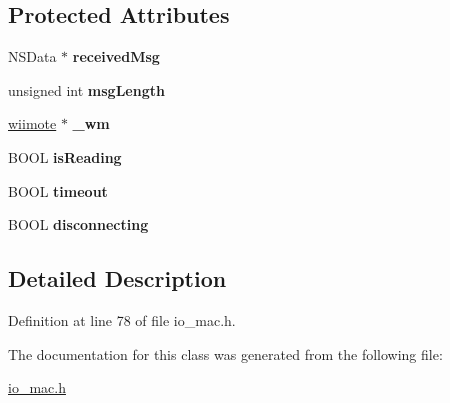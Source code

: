 \subsection*{Protected Attributes}
\begin{DoxyCompactItemize}
\item 
\hypertarget{interface_wii_connect_aec21ec9602201383bba36942cebb6011}{N\-S\-Data $\ast$ {\bfseries received\-Msg}}\label{interface_wii_connect_aec21ec9602201383bba36942cebb6011}

\item 
\hypertarget{interface_wii_connect_ac15cec89972ac285875a76e9f1576060}{unsigned int {\bfseries msg\-Length}}\label{interface_wii_connect_ac15cec89972ac285875a76e9f1576060}

\item 
\hypertarget{interface_wii_connect_aaf493501ef451d77d49546beec8c2db9}{\hyperlink{structwiimote__t}{wiimote} $\ast$ {\bfseries \-\_\-wm}}\label{interface_wii_connect_aaf493501ef451d77d49546beec8c2db9}

\item 
\hypertarget{interface_wii_connect_a578cdc47ce08accc0072b70dc99ac666}{B\-O\-O\-L {\bfseries is\-Reading}}\label{interface_wii_connect_a578cdc47ce08accc0072b70dc99ac666}

\item 
\hypertarget{interface_wii_connect_afcc5333eadf106d01476621373122418}{B\-O\-O\-L {\bfseries timeout}}\label{interface_wii_connect_afcc5333eadf106d01476621373122418}

\item 
\hypertarget{interface_wii_connect_aa6640f064f8d382d4612e200e14e06a8}{B\-O\-O\-L {\bfseries disconnecting}}\label{interface_wii_connect_aa6640f064f8d382d4612e200e14e06a8}

\end{DoxyCompactItemize}


\subsection{Detailed Description}


Definition at line 78 of file io\-\_\-mac.\-h.



The documentation for this class was generated from the following file\-:\begin{DoxyCompactItemize}
\item 
\hyperlink{io__mac_8h}{io\-\_\-mac.\-h}\end{DoxyCompactItemize}
